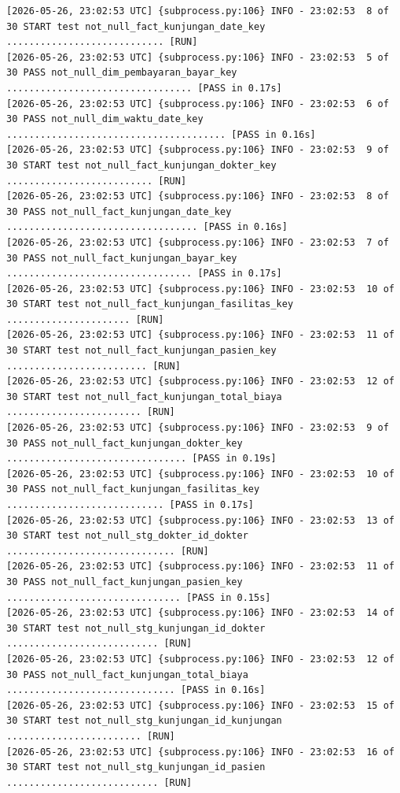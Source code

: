 \begin{lstlisting}[language={}, caption=Output Terminal dbt test pada Airflow Log]
[2026-05-26, 23:02:53 UTC] {subprocess.py:106} INFO - 23:02:53  8 of 30 START test not_null_fact_kunjungan_date_key ............................ [RUN]
[2026-05-26, 23:02:53 UTC] {subprocess.py:106} INFO - 23:02:53  5 of 30 PASS not_null_dim_pembayaran_bayar_key ................................. [PASS in 0.17s]
[2026-05-26, 23:02:53 UTC] {subprocess.py:106} INFO - 23:02:53  6 of 30 PASS not_null_dim_waktu_date_key ....................................... [PASS in 0.16s]
[2026-05-26, 23:02:53 UTC] {subprocess.py:106} INFO - 23:02:53  9 of 30 START test not_null_fact_kunjungan_dokter_key .......................... [RUN]
[2026-05-26, 23:02:53 UTC] {subprocess.py:106} INFO - 23:02:53  8 of 30 PASS not_null_fact_kunjungan_date_key .................................. [PASS in 0.16s]
[2026-05-26, 23:02:53 UTC] {subprocess.py:106} INFO - 23:02:53  7 of 30 PASS not_null_fact_kunjungan_bayar_key ................................. [PASS in 0.17s]
[2026-05-26, 23:02:53 UTC] {subprocess.py:106} INFO - 23:02:53  10 of 30 START test not_null_fact_kunjungan_fasilitas_key ...................... [RUN]
[2026-05-26, 23:02:53 UTC] {subprocess.py:106} INFO - 23:02:53  11 of 30 START test not_null_fact_kunjungan_pasien_key ......................... [RUN]
[2026-05-26, 23:02:53 UTC] {subprocess.py:106} INFO - 23:02:53  12 of 30 START test not_null_fact_kunjungan_total_biaya ........................ [RUN]
[2026-05-26, 23:02:53 UTC] {subprocess.py:106} INFO - 23:02:53  9 of 30 PASS not_null_fact_kunjungan_dokter_key ................................ [PASS in 0.19s]
[2026-05-26, 23:02:53 UTC] {subprocess.py:106} INFO - 23:02:53  10 of 30 PASS not_null_fact_kunjungan_fasilitas_key ............................ [PASS in 0.17s]
[2026-05-26, 23:02:53 UTC] {subprocess.py:106} INFO - 23:02:53  13 of 30 START test not_null_stg_dokter_id_dokter .............................. [RUN]
[2026-05-26, 23:02:53 UTC] {subprocess.py:106} INFO - 23:02:53  11 of 30 PASS not_null_fact_kunjungan_pasien_key ............................... [PASS in 0.15s]
[2026-05-26, 23:02:53 UTC] {subprocess.py:106} INFO - 23:02:53  14 of 30 START test not_null_stg_kunjungan_id_dokter ........................... [RUN]
[2026-05-26, 23:02:53 UTC] {subprocess.py:106} INFO - 23:02:53  12 of 30 PASS not_null_fact_kunjungan_total_biaya .............................. [PASS in 0.16s]
[2026-05-26, 23:02:53 UTC] {subprocess.py:106} INFO - 23:02:53  15 of 30 START test not_null_stg_kunjungan_id_kunjungan ........................ [RUN]
[2026-05-26, 23:02:53 UTC] {subprocess.py:106} INFO - 23:02:53  16 of 30 START test not_null_stg_kunjungan_id_pasien ........................... [RUN]

\end{lstlisting}
